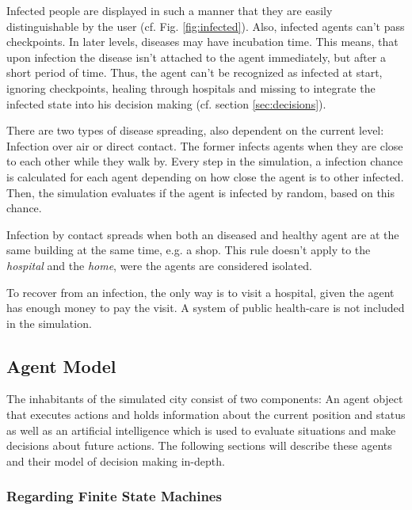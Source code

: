 \documentclass[table]{sig-alternate-05-2015}
\begin{document}
Infected people are displayed in such a manner that they are easily distinguishable by the user (cf. Fig. \ref{fig:infected}). Also, infected agents can't pass checkpoints. In later levels, diseases may have incubation time. This means, that upon infection the disease isn't attached to the agent immediately, but after a short period of time. Thus, the agent can't be recognized as infected at start, ignoring checkpoints, healing through hospitals and missing to integrate the infected state into his decision making (cf. section \ref{sec:decisions}).

There are two types of disease spreading, also dependent on the current level: Infection over air or direct contact. The former infects agents when they are close to each other while they walk by. Every step in the simulation, a infection chance is calculated for each agent depending on how close the agent is to other infected. Then, the simulation evaluates if the agent is infected by random, based on this chance.

Infection by contact spreads when both an diseased and healthy agent are at the same building at the same time, e.g. a shop. This rule doesn't apply to the \textit{hospital} and the \textit{home}, were the agents are considered isolated.

To recover from an infection, the only way is to visit a hospital, given the agent has enough money to pay the visit. A system of public health-care is not included in the simulation.

\subsection{Agent Model}
\label{sec:agents}

The inhabitants of the simulated city consist of  two components: An agent object that executes actions and holds information about the current position and status as well as an artificial intelligence which is used to evaluate situations and make decisions about future actions. The following sections will describe these agents and their model of decision making in-depth.

\subsubsection{Regarding Finite State Machines}
\end{document}
